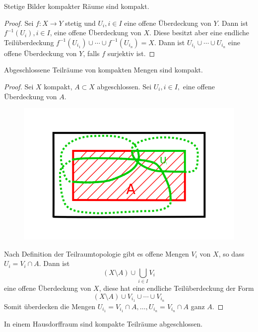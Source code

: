 \documentclass[a4paper,10pt]{scrartcl}
\begin{document}
\begin{st}\label{thm:1.6.6}
 Stetige Bilder kompakter Räume sind kompakt.
\end{st}
\begin{proof}
Sei $f:X\to Y$ stetig und $U_i, i\in I$ eine offene Überdeckung von $Y$. Dann ist $f^{-1}(U_i),i\in I$, eine offene Überdeckung von $X$. Diese besitzt aber eine endliche Teilüberdeckung $f^{-1}(U_{i_1})\cup \dotsb \cup f^{-1}(U_{i_n})=X$. Dann ist $U_{i_1}\cup \dotsb \cup U_{i_n}$ eine offene Überdeckung von $Y$, falls $f$ surjektiv ist.
\end{proof}
\begin{st}\label{thm:1.6.7}
 Abgeschlossene Teilräume von kompakten Mengen sind kompakt.
\end{st}
\begin{proof}
 Sei $X$ kompakt, $A\subset X$ abgeschlossen. Sei $U_i, i\in I,$ eine offene Überdeckung von $A$.
\begin{figure}[ht]
\centering
\includegraphics[scale=0.5]{fig27.png}
\caption{}
\end{figure}

Nach Definition der Teilraumtopologie gibt es offene Mengen $V_i$ von $X$, so dass $U_i=V_i\cap A$. Dann ist 
\[
 (X\setminus A) \cup \bigcup_{i\in I} V_i
\]
eine offene Überdeckung von $X$, diese hat eine endliche Teilüberdeckung der Form 
\[
(X\setminus A)\cup V_{i_1} \cup\dotsb \cup V_{i_n}
\]
Somit überdecken die Mengen $U_{i_1}=V_{i_1}\cap A, \dotsc  , U_{i_n}=V_{i_n}\cap A$ ganz $A$.
\end{proof}
\begin{st} \label{thm:1.6.8}
In einem Hausdorffraum sind kompakte Teilräume abgeschlossen.
\end{st}
\end{document}
